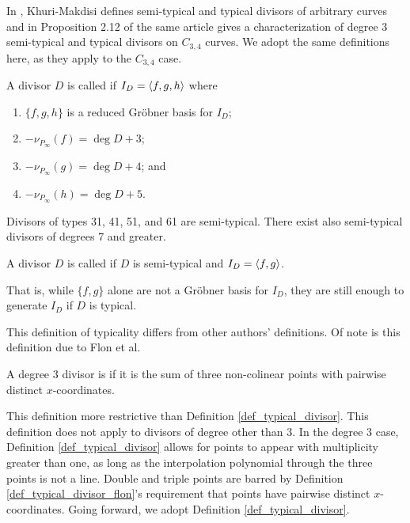 In \cite{kmakdisi18}, Khuri-Makdisi defines semi-typical and typical divisors of arbitrary curves
and in Proposition 2.12 of the same article gives a characterization of degree 3
semi-typical and typical divisors on $C_{3,4}$ curves.
We adopt the same definitions here, as they apply to the $C_{3,4}$ case.
\begin{definition}
  \label{def_semitypical_divisor}
  A divisor $D$ is called  if $I_D = \left\langle f, g, h \right\rangle$ where
  \begin{enumerate}[label=(\roman*)]
    \item $\{f, g, h\}$ is a reduced Gr\"obner basis for $I_D$;
    \item $-\nu_{P_\infty}(f) = \deg D + 3$;
    \item $-\nu_{P_\infty}(g) = \deg D + 4$; and
    \item $-\nu_{P_\infty}(h) = \deg D + 5$.
  \end{enumerate}
\end{definition}
Divisors of types 31, 41, 51, and 61 are semi-typical.
There exist also semi-typical divisors of degrees 7 and greater.
\begin{definition}
  \label{def_typical_divisor}
  A divisor $D$ is called  if $D$ is semi-typical and $I_D = \left\langle f, g \right\rangle$.
\end{definition}
That is, while $\{f, g\}$ alone are not a Gr\"obner basis for $I_D$,
they are still enough to generate $I_D$ if $D$ is typical.

This definition of typicality differs from other authors' definitions.
Of note is this definition due to Flon et al.
\begin{definition}
  \label{def_typical_divisor_flon}
  A degree 3 divisor is  if it is the sum of three non-colinear points
  with pairwise distinct $x$-coordinates.
\end{definition}
This definition more restrictive than Definition \ref{def_typical_divisor}.
This definition does not apply to divisors of degree other than 3.
In the degree 3 case, Definition \ref{def_typical_divisor} allows for points to appear with multiplicity
greater than one, as long as the interpolation polynomial through the three points is not a line.
Double and triple points are barred by Definition \ref{def_typical_divisor_flon}'s requirement that
points have pairwise distinct $x$-coordinates.
Going forward, we adopt Definition \ref{def_typical_divisor}.

